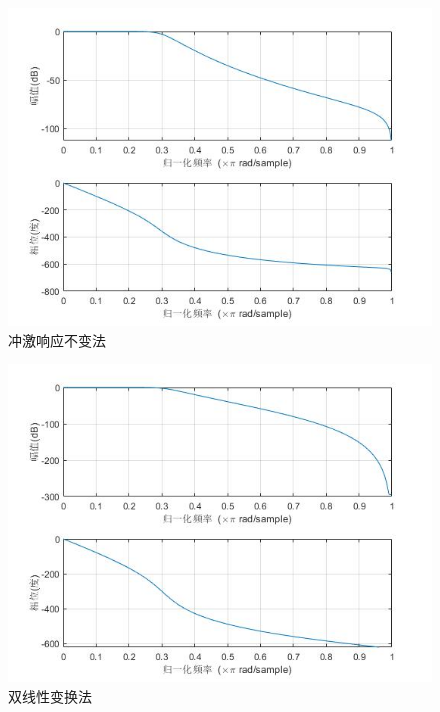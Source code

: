 \documentclass{seuer}
\begin{document}
\begin{figure}[H] %
	\centering %
	\includegraphics[width=1\textwidth]{"../DSPAssignment/冲激响应不变法.jpg"} %
	\caption{冲激响应不变法} %
	\label{Fig5} %
\end{figure}
\begin{figure}[H] %
	\centering %
	\includegraphics[width=1\textwidth]{"../DSPAssignment/双线性变换法.jpg"} %
	\caption{双线性变换法} %
	\label{Fig6} %
\end{figure}
\end{document}
